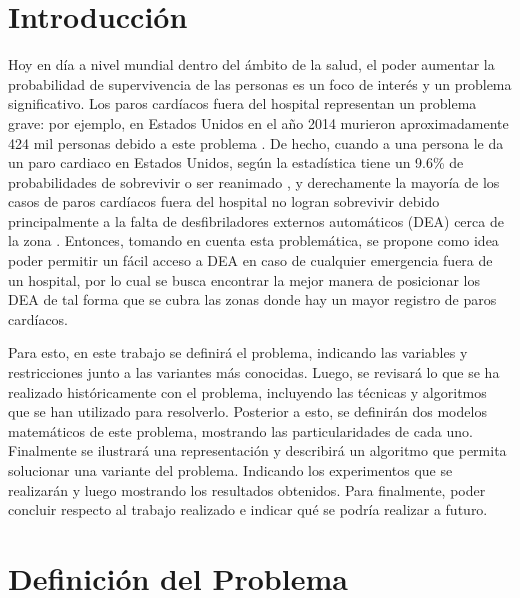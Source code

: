 \documentclass[letter, 10pt]{article}
\begin{document}
\section{Introducci\'on}
Hoy en d\'ia a nivel mundial dentro del \'ambito de la salud, el poder aumentar la probabilidad de supervivencia de las personas es un foco de inter\'es y un problema significativo. Los paros card\'iacos fuera del hospital representan un problema grave: por ejemplo, en Estados Unidos en el a\~no 2014 murieron aproximadamente 424 mil personas debido a este problema \cite{Go}. De hecho, cuando a una persona le da un paro cardiaco en Estados Unidos, seg\'un la estad\'istica tiene un 9.6\% de probabilidades de sobrevivir o ser reanimado \cite{Nurnber}, y derechamente la mayor\'ia de los casos de paros card\'iacos fuera del hospital no logran sobrevivir debido principalmente a la falta de desfibriladores externos autom\'aticos (DEA) cerca de la zona \cite{Grasner}. Entonces, tomando en cuenta esta problem\'atica, se propone como idea poder permitir un f\'acil acceso a DEA en caso de cualquier emergencia fuera de un hospital, por lo cual se busca encontrar la mejor manera de posicionar los DEA de tal forma que se cubra las zonas donde hay un mayor registro de paros card\'iacos. 

Para esto, en este trabajo se definir\'a el problema, indicando las variables y restricciones junto a las variantes m\'as conocidas. Luego, se revisar\'a lo que se ha realizado hist\'oricamente con el problema, incluyendo las t\'ecnicas y algoritmos que se han utilizado para resolverlo. Posterior a esto, se definir\'an dos modelos matem\'aticos de este problema, mostrando las particularidades de cada uno. Finalmente se ilustrar\'a una representaci\'on y describir\'a un algoritmo que permita solucionar una variante del problema. Indicando los experimentos que se realizar\'an y luego mostrando los resultados obtenidos. Para finalmente, poder concluir respecto al trabajo realizado e indicar qu\'e se podr\'ia realizar a futuro.


\section{Definici\'on del Problema} 
\end{document}
